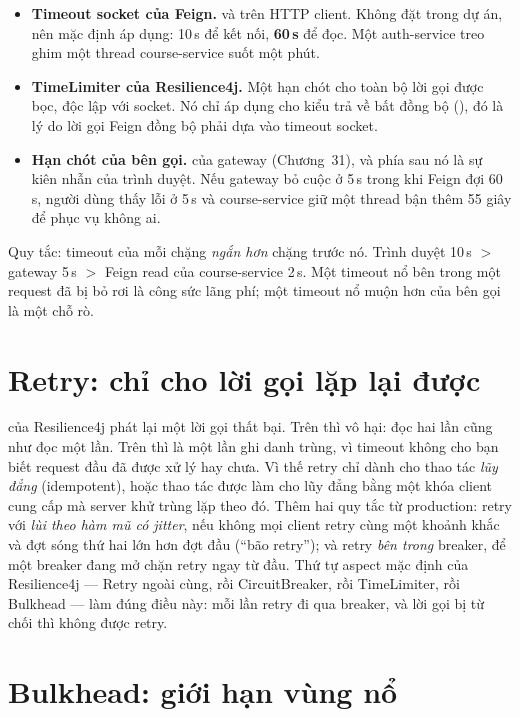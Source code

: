 \begin{itemize}
  \item \textbf{Timeout socket của Feign.}  và
   trên HTTP client. Không đặt trong dự án, nên mặc
  định áp dụng: 10\,s để kết nối, \textbf{60\,s} để đọc. Một
  auth-service treo ghim một thread course-service suốt một phút.
  \item \textbf{TimeLimiter của Resilience4j.} Một hạn chót cho toàn
  bộ lời gọi được bọc, độc lập với socket. Nó chỉ áp dụng cho kiểu trả
  về bất đồng bộ (), đó là lý do lời gọi Feign
  đồng bộ phải dựa vào timeout socket.
  \item \textbf{Hạn chót của bên gọi.}  của
  gateway (Chương~31), và phía sau nó là sự kiên nhẫn của trình duyệt.
  Nếu gateway bỏ cuộc ở 5\,s trong khi Feign đợi 60\,s, người dùng thấy
  lỗi ở 5\,s và course-service giữ một thread bận thêm 55 giây để phục
  vụ không ai.
\end{itemize}

Quy tắc: timeout của mỗi chặng \emph{ngắn hơn} chặng trước nó. Trình
duyệt 10\,s $>$ gateway 5\,s $>$ Feign read của course-service 2\,s.
Một timeout nổ bên trong một request đã bị bỏ rơi là công sức lãng
phí; một timeout nổ muộn hơn của bên gọi là một chỗ rò.

\section{Retry: chỉ cho lời gọi lặp lại được}

 của Resilience4j phát lại một lời gọi thất bại. Trên
 thì vô hại: đọc hai lần cũng như đọc một lần.
Trên  thì là một lần ghi danh trùng, vì timeout
không cho bạn biết request đầu đã được xử lý hay chưa. Vì thế retry chỉ
dành cho thao tác \emph{lũy đẳng} (idempotent), hoặc thao tác được làm
cho lũy đẳng bằng một khóa client cung cấp mà server khử trùng lặp
theo đó. Thêm hai quy tắc từ production: retry với \emph{lùi theo hàm
mũ có jitter}, nếu không mọi client retry cùng một khoảnh khắc và đợt
sóng thứ hai lớn hơn đợt đầu (``bão retry''); và retry \emph{bên trong}
breaker, để một breaker đang mở chặn retry ngay từ đầu. Thứ tự aspect
mặc định của Resilience4j --- Retry ngoài cùng, rồi CircuitBreaker,
rồi TimeLimiter, rồi Bulkhead --- làm đúng điều này: mỗi lần retry đi
qua breaker, và lời gọi bị từ chối thì không được retry.

\section{Bulkhead: giới hạn vùng nổ}

